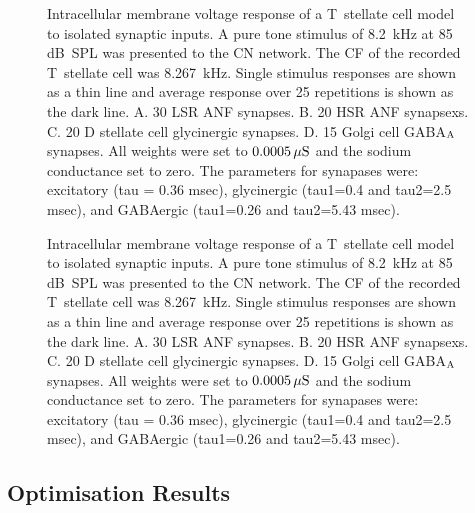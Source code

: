 \begin{figure}[htb]
  \centering
  \caption[Response of T~stellate cells to isolated synaptic
  inputs]{Intracellular membrane voltage response of a T~stellate cell model to
    isolated synaptic inputs. A pure tone stimulus of 8.2~kHz at 85 dB~SPL was
    presented to the CN network. The CF of the recorded T~stellate cell was
    8.267~kHz.  Single stimulus responses are shown as a thin line and average
    response over 25 repetitions is shown as the dark line. A. 30 LSR ANF
    synapses. B. 20 HSR ANF synapsexs. C. 20 D stellate cell glycinergic
    synapses. D. 15 Golgi cell GABA$_{\rm A}$ synapses. All weights were set to
    $0.0005\,\mu{\rm S}$ and the sodium conductance set to zero.  The parameters
    for synapases were: excitatory (tau = 0.36 msec), glycinergic (tau1=0.4 and
    tau2=2.5 msec), and GABAergic (tau1=0.26 and tau2=5.43
    msec).\label{fig:TSinputs}}
\end{figure}

\begin{figure}[htb]
  \centering
\caption[Response of T~stellate cells to isolated synaptic
  inputs]{Intracellular membrane voltage response of a T~stellate cell model to
    isolated synaptic inputs. A pure tone stimulus of 8.2~kHz at 85 dB~SPL was
    presented to the CN network. The CF of the recorded T~stellate cell was
    8.267~kHz.  Single stimulus responses are shown as a thin line and average
    response over 25 repetitions is shown as the dark line. A. 30 LSR ANF
    synapses. B. 20 HSR ANF synapsexs. C. 20 D stellate cell glycinergic
    synapses. D. 15 Golgi cell GABA$_{\rm A}$ synapses. All weights were set to
    $0.0005\,\mu{\rm S}$ and the sodium conductance set to zero.  The parameters
    for synapases were: excitatory (tau = 0.36 msec), glycinergic (tau1=0.4 and
    tau2=2.5 msec), and GABAergic (tau1=0.26 and tau2=5.43
    msec).\label{fig:TSExcinputs}}
\end{figure}





\subsection{Optimisation Results}

